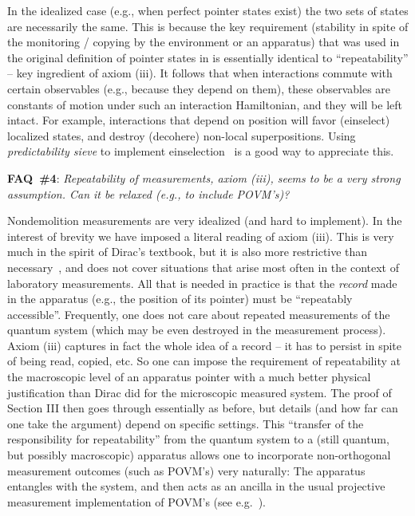 \documentclass[aps,amsmath,amssymb,amsfonts,floatfix]{revtex4-1}
\newcommand{\+}         {\dagger}
\begin{document}
{{{In the idealized case (e.g., when perfect pointer states exist) the two sets of states are necessarily the same. This is because the key requirement (stability in spite of the monitoring / copying by the environment or an apparatus) that was used in the original definition of pointer states in \cite{69} is essentially identical to ``repeatability'' -- key ingredient of axiom (iii). It follows that when interactions commute with certain observables (e.g., because they depend on them), these observables are constants of motion under such an interaction Hamiltonian, and they will be left intact. For example, interactions that depend on position will favor (einselect) localized states, and destroy (decohere) non-local superpositions. Using {\it predictability sieve} to implement einselection~\cite{5,75,45,52}
is a good way to appreciate this.

{\bf FAQ~\#4}: {\it Repeatability of measurements, axiom (iii), seems to be a very strong assumption. Can it be relaxed (e.g., to include POVM's)?}

Nondemolition measurements are very idealized (and hard to implement). In the interest of brevity we have imposed a literal reading of axiom (iii). This is very much in the spirit of Dirac's textbook, but it is also more restrictive than necessary~\cite{79}, and does not cover situations that arise most often in the context of laboratory measurements. All that is needed in practice is that the {\it record} made in the apparatus (e.g., the position of its pointer) must be ``repeatably accessible''. Frequently, one does not care about repeated measurements of the quantum system (which may be even destroyed in the measurement process). Axiom (iii) captures in fact the whole idea of a record -- it has to persist in spite of being read, copied, etc. So one can impose the requirement of repeatability at the macroscopic level of an apparatus pointer with a much better physical justification than Dirac did for the microscopic measured system. The proof of Section III then goes through essentially as before, but details (and how far can one take the argument) depend on specific settings. This ``transfer of the responsibility for repeatability'' from the quantum system to a (still quantum, but possibly macroscopic) apparatus allows one to incorporate non-orthogonal measurement outcomes (such as POVM's) very naturally: The apparatus entangles with the system, and then acts as an ancilla in the usual projective measurement implementation of POVM's (see e.g.~\cite{NC}).

}}}
\end{document}
